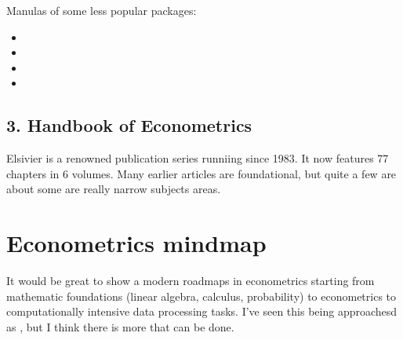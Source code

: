 \documentclass[letterpaper,10pt,english]{sphinxmanual}
\begin{document}
Manulas of some less popular packages:
\begin{itemize}
\item {} 

\item {} 

\item {} 

\item {} 

\end{itemize}


\subsection{3. Handbook of Econometrics}
\label{\detokenize{how-to-teach/ways-into-econometrics:handbook-of-econometrics}}
Elsivier 
is a renowned publication series runniing since 1983. It now
features 77 chapters in 6 volumes. Many earlier articles are
foundational, but quite a few are about some are really narrow
subjects areas.


\section{Econometrics mindmap}
\label{\detokenize{how-to-teach/mindmap:econometrics-mindmap}}\label{\detokenize{how-to-teach/mindmap::doc}}
It would be great to show a modern roadmaps in econometrics starting
from mathematic foundations (linear algebra, calculus, probability) to
econometrics to computationally intensive data processing tasks.
I’ve seen this being approachesd as , but I think there
is more that can be done.
\end{document}
